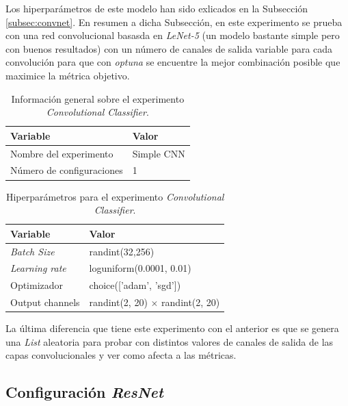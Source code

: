Los hiperparámetros de este modelo han sido exlicados en la Subsección \ref{subsec:convnet}. En resumen a dicha Subsección, en este experimento se prueba con una red convolucional basasda en \textit{LeNet-5} (un modelo bastante simple pero con buenos resultados) con un número de canales de salida variable para cada convolución para que con \textit{optuna} se encuentre la mejor combinación posible que maximice la métrica objetivo.\\

\begin{table}[H]
\centering
\begin{tabular}[c]{m{6cm}m{3cm}}
\hline
\textbf{Variable}                 & \textbf{Valor}  \\ \hline
Nombre del experimento            & Simple CNN      \\
Número de configuraciones         & 1               \\ \hline
\end{tabular}
\caption{Información general sobre el experimento \textit{Convolutional Classifier}.}
\label{tab:convnetinfo}
\end{table}

\begin{table}[H]
\centering
\begin{tabular}{m{3cm}m{5.1cm}}
\hline
\textbf{Variable}                 & \textbf{Valor}                          \\ \hline
\textit{Batch Size}               & randint(32,256)                         \\
\textit{Learning rate}            & loguniform(0.0001, 0.01)                \\
Optimizador                       & choice(['adam', 'sgd'])                 \\ 
Output channels                   & randint(2, 20) $\times$ randint(2, 20)  \\ \hline
\end{tabular}
\caption{Hiperparámetros para el experimento \textit{Convolutional Classifier}.}
\label{tab:convnetconfig}
\end{table}

La última diferencia que tiene este experimento con el anterior es que se genera una \textit{List} aleatoria para probar con distintos valores de canales de salida de las capas convolucionales y ver como afecta a las métricas.\\

\subsection{Configuración \textit{ResNet}}\label{subsec:resnet}

